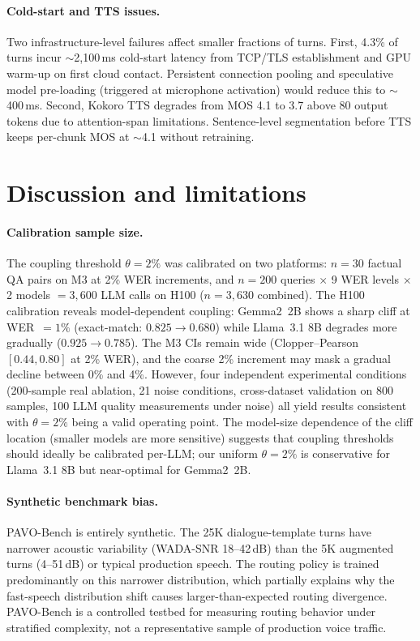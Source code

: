 \documentclass{article}
\begin{document}
\paragraph{Cold-start and TTS issues.}
Two infrastructure-level failures affect smaller fractions of turns. First, 4.3\% of turns incur ${\sim}$2{,}100\,ms cold-start latency from TCP/TLS establishment and GPU warm-up on first cloud contact. Persistent connection pooling and speculative model pre-loading (triggered at microphone activation) would reduce this to ${\sim}$400\,ms. Second, Kokoro TTS degrades from MOS 4.1 to 3.7 above 80 output tokens due to attention-span limitations. Sentence-level segmentation before TTS keeps per-chunk MOS at ${\sim}$4.1 without retraining.

\section{Discussion and limitations}
\label{sec:discussion}

\paragraph{Calibration sample size.} The coupling threshold $\theta=2\%$ was calibrated on two platforms: $n=30$ factual QA pairs on M3 at 2\% WER increments, and $n=200$ queries $\times$ 9 WER levels $\times$ 2 models $= 3{,}600$ LLM calls on H100 ($n=3{,}630$ combined). The H100 calibration reveals model-dependent coupling: Gemma2~2B shows a sharp cliff at WER~$=1\%$ (exact-match: $0.825 \to 0.680$) while Llama~3.1 8B degrades more gradually ($0.925 \to 0.785$). The M3 CIs remain wide (Clopper--Pearson $[0.44, 0.80]$ at 2\% WER), and the coarse 2\% increment may mask a gradual decline between 0\% and 4\%. However, four independent experimental conditions (200-sample real ablation, 21 noise conditions, cross-dataset validation on 800 samples, 100 LLM quality measurements under noise) all yield results consistent with $\theta=2\%$ being a valid operating point. The model-size dependence of the cliff location (smaller models are more sensitive) suggests that coupling thresholds should ideally be calibrated per-LLM; our uniform $\theta=2\%$ is conservative for Llama~3.1 8B but near-optimal for Gemma2~2B.

\paragraph{Synthetic benchmark bias.} PAVO-Bench is entirely synthetic. The 25K dialogue-template turns have narrower acoustic variability (WADA-SNR 18--42\,dB) than the 5K augmented turns (4--51\,dB) or typical production speech. The routing policy is trained predominantly on this narrower distribution, which partially explains why the fast-speech distribution shift causes larger-than-expected routing divergence. PAVO-Bench is a controlled testbed for measuring routing behavior under stratified complexity, not a representative sample of production voice traffic.
\end{document}
